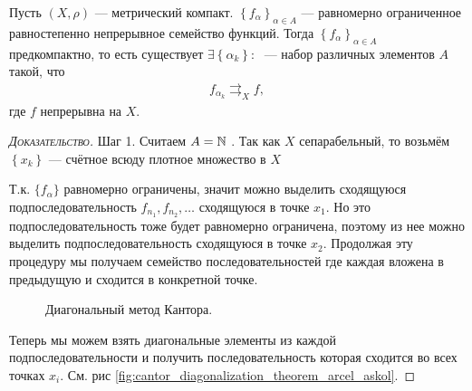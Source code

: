\documentclass[../complex-analysis.tex]{subfiles}
\begin{document}
 \begin{thm}
  Пусть $ (X,\rho) $ --- метрический компакт.  $ \left\{f_\alpha\right\}_{\alpha \in A}  $ --- равномерно ограниченное равностепенно непрерывное семейство функций. Тогда $ \left\{f_\alpha\right\}_{\alpha \in A} $ предкомпактно, то есть существует $ \exists \left\{\alpha_k\right\} \colon\;  $ --- набор различных элементов $ A $ такой, что
  \begin{align*}
   f_{\alpha_k} \rightrightarrows_X f,
  \end{align*} где $ f $ непрерывна на $ X $.
 \end{thm}
 \begin{proof}[\normalfont\textsc{Доказательство}]
  Шаг 1. Считаем $ A = \mathbb{N} $ . Так как $ X $  сепарабельный, то возьмём $ \left\{x_k\right\}  $ --- счётное всюду плотное множество в $X$

  Т.к. $\{ f_\alpha \}$ равномерно ограничены, значит можно выделить сходящуюся подпоследовательность $f_{n_1}, f_{n_2}, \ldots $ сходящуюся в точке $x_1$.
  Но это подпоследовательность тоже будет равномерно ограничена, поэтому из нее можно выделить подпоследовательность сходящуюся в точке $x_2$.
  Продолжая эту процедуру мы получаем семейство последовательностей где каждая вложена в предыдущую и сходится в конкретной точке.
  
\begin{figure}[ht]
    \centering
    \caption{Диагональный метод Кантора.}
    \label{fig:cantor_diagonalization_theorem_arcel_askol}
\end{figure}

  Теперь мы можем взять диагональные элементы из каждой подпоследовательности и получить последовательность которая сходится во всех точках $x_i$.
  См. рис \eqref{fig:cantor_diagonalization_theorem_arcel_askol}. 
\end{proof}
\end{document}
